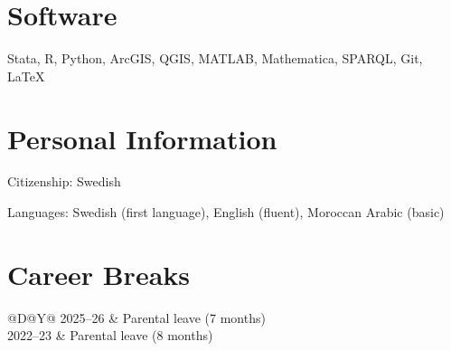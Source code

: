 \documentclass[a4paper]{article}
\makeatletter
\newenvironment{cvtabular}
  {\begin{tabular}{@{}D@{\hspace{6pt}}Y@{}}}
  {\end{tabular}}
\renewenvironment{itemize}{
  \begin{list}{}{
    \setlength{\leftmargin}{1.5em}
  }
}{
  \end{list}
}
\makeatother
\begin{document}
\section*{Software}

Stata, R, Python, ArcGIS, QGIS, MATLAB, Mathematica, SPARQL, Git, \LaTeX %

\section*{Personal Information}

\begin{itemize}
\item Citizenship: Swedish
\item Languages: Swedish (first language), English (fluent), Moroccan Arabic (basic)
\end{itemize}

\section*{Career Breaks}

\begin{cvtabular}
2025--26 & Parental leave (7 months) \\
2022--23 & Parental leave (8 months)
\end{cvtabular}
\end{document}
